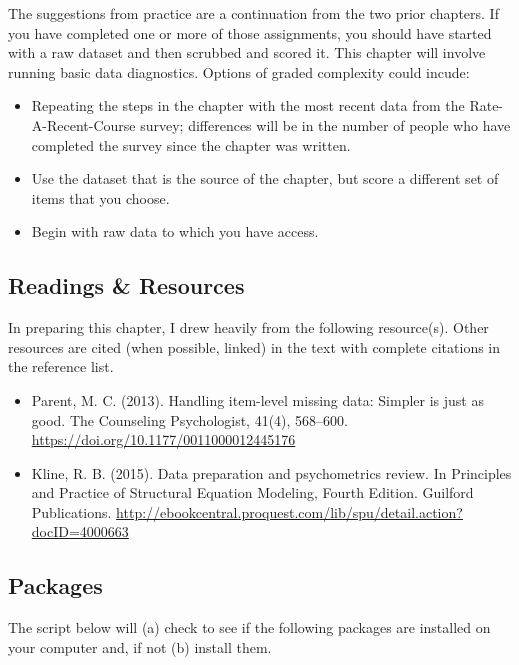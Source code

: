 \documentclass[
  11pt,
]{book}
\providecommand{\tightlist}{%
  \setlength{\itemsep}{0pt}\setlength{\parskip}{0pt}}
\begin{document}
The suggestions from practice are a continuation from the two prior chapters. If you have completed one or more of those assignments, you should have started with a raw dataset and then scrubbed and scored it. This chapter will involve running basic data diagnostics. Options of graded complexity could incude:

\begin{itemize}
\tightlist
\item
  Repeating the steps in the chapter with the most recent data from the Rate-A-Recent-Course survey; differences will be in the number of people who have completed the survey since the chapter was written.
\item
  Use the dataset that is the source of the chapter, but score a different set of items that you choose.
\item
  Begin with raw data to which you have access.
\end{itemize}

\hypertarget{readings-resources-2}{%
\subsection{Readings \& Resources}\label{readings-resources-2}}

In preparing this chapter, I drew heavily from the following resource(s). Other resources are cited (when possible, linked) in the text with complete citations in the reference list.

\begin{itemize}
\item
  Parent, M. C. (2013). Handling item-level missing data: Simpler is just as good. The Counseling Psychologist, 41(4), 568--600. \url{https://doi.org/10.1177/0011000012445176}
\item
  Kline, R. B. (2015). Data preparation and psychometrics review. In Principles and Practice of Structural Equation Modeling, Fourth Edition. Guilford Publications. \url{http://ebookcentral.proquest.com/lib/spu/detail.action?docID=4000663}
\end{itemize}

\hypertarget{packages-3}{%
\subsection{Packages}\label{packages-3}}

The script below will (a) check to see if the following packages are installed on your computer and, if not (b) install them.
\end{document}
